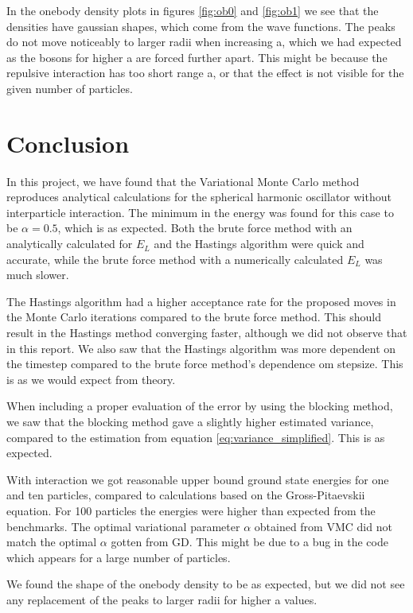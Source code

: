 \documentclass[norsk,a4paper,12pt]{article}
\begin{document}
In the onebody density plots in figures \ref{fig:ob0} and \ref{fig:ob1} we see that the densities have gaussian shapes, which come from the wave functions. The peaks do not move noticeably to larger radii when increasing a, which we had expected as the bosons for higher a are forced further apart. This might be because the repulsive interaction has too short range a, or that the effect is not visible for the given number of particles. 

\section{Conclusion}

In this project, we have found that the Variational Monte Carlo method reproduces analytical calculations for the spherical harmonic oscillator without interparticle interaction. The minimum in the energy was found for this case to be $\alpha=0.5$, which is as expected. Both the brute force method with an analytically calculated for $E_L$ and the Hastings algorithm were quick and accurate, while the brute force method with a numerically calculated $E_L$ was much slower.

The Hastings algorithm had a higher acceptance rate for the proposed moves in the Monte Carlo iterations compared to the brute force method. This should result in the Hastings method converging faster, although we did not observe that in this report. We also saw that the Hastings algorithm was more dependent on the timestep compared to the brute force method's dependence om stepsize. This is as we would expect from theory.  \par
When including a proper evaluation of the error by using the blocking method, we saw that the blocking method gave a slightly higher estimated variance, compared to the estimation from equation \ref{eq:variance_simplified}. This is as expected.

With interaction we got reasonable upper bound ground state energies for one and ten particles, compared to calculations based on the Gross-Pitaevskii equation. For 100 particles the energies were higher than expected from the benchmarks. The optimal variational parameter $\alpha$ obtained from VMC did not match the optimal $\alpha$ gotten from GD. This might be due to a bug in the code which appears for a large number of particles. 

We found the shape of the onebody density to be as expected, but we did not see any replacement of the peaks to larger radii for higher a values.
\end{document}
